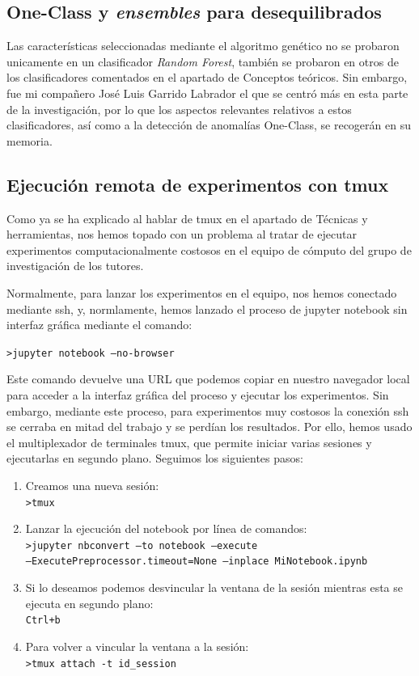\subsection{One-Class y \textit{ensembles} para desequilibrados}

Las características seleccionadas mediante el algoritmo genético no se probaron unicamente en un clasificador \textit{Random Forest}, también se probaron en otros de los clasificadores comentados en el apartado de Conceptos teóricos. Sin embargo, fue mi compañero José Luis Garrido Labrador el que se centró más en esta parte de la investigación, por lo que los aspectos relevantes relativos a estos clasificadores, así como a la detección de anomalías One-Class, se recogerán en su memoria. 

\subsection{Ejecución remota de experimentos con tmux}

Como ya se ha explicado al hablar de tmux en el apartado de Técnicas y herramientas, nos hemos topado con un problema al tratar de ejecutar experimentos computacionalmente costosos en el equipo de cómputo del grupo de investigación de los tutores. 

Normalmente, para lanzar los experimentos en el equipo, nos hemos conectado mediante ssh, y, normlamente, hemos lanzado el proceso de jupyter notebook sin interfaz gráfica mediante el comando: 

\texttt{>jupyter notebook ---no-browser}

Este comando devuelve una URL que podemos copiar en nuestro navegador local para acceder a la interfaz gráfica del proceso y ejecutar los experimentos. Sin embargo, mediante este proceso, para experimentos muy costosos la conexión ssh se cerraba en mitad del trabajo y se perdían los resultados. Por ello, hemos usado el multiplexador de terminales tmux, que permite iniciar varias sesiones y ejecutarlas en segundo plano. Seguimos los siguientes pasos: 

\begin{minipage}{\linewidth} 
\begin{enumerate}
	\item Creamos una nueva sesión: 
	\\\texttt{>tmux}
	\item Lanzar la ejecución del notebook por línea de comandos: 
	\\\texttt{>jupyter nbconvert ---to notebook ---execute \\---ExecutePreprocessor.timeout=None ---inplace MiNotebook.ipynb}
	\item Si lo deseamos podemos desvincular la ventana de la sesión mientras esta se ejecuta en segundo plano: 
	\\\texttt{Ctrl+b}
	\item Para volver a vincular la ventana a la sesión: 
	\\\texttt{>tmux attach -t id\_session}
\end{enumerate}
\end{minipage}

